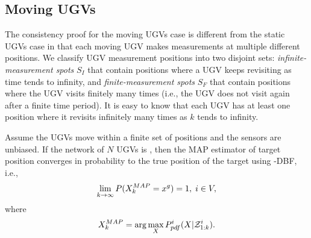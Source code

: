 	\subsection{Moving UGVs}
	The consistency proof for the moving UGVs case is different from the static UGVs case in that each moving UGV makes measurements at multiple different positions.
	We classify UGV measurement positions into two disjoint sets: \textit{infinite-measurement spots} \textcolor{\revcol}{$S_I$} that contain positions where a UGV keeps revisiting as time tends to infinity, and \textit{finite-measurement spots} \textcolor{\revcol}{$S_F$} that contain positions where the UGV visits finitely many times (i.e., the UGV does not visit again after a finite time period).
	It is easy to know that each UGV has at least one position where it revisits infinitely many times as $k$ tends to infinity.
%		
			
	\begin{thm}\label{thm:\proto-dbf-mov-ugv}
		Assume the UGVs move within a finite set of positions and the sensors are unbiased. If the network of $N$ UGVs is \fc, then the MAP estimator of target position converges in probability to the true position of the target using \proto-DBF, i.e.,
		\small\begin{equation*}
		\lim\limits_{k\rightarrow \infty}
		P(X^{MAP}_k=x^g)=1,\;i\in V,
		\end{equation*}\normalsize		
		\textcolor{\revcol}{where 
		\small\begin{equation*}
		X_k^{MAP}=\arg\max\limits_{X}P^i_{pdf}(X|\mathcal{Z}^{i}_{1:k}).
		\end{equation*}}	
	\end{thm}
		
